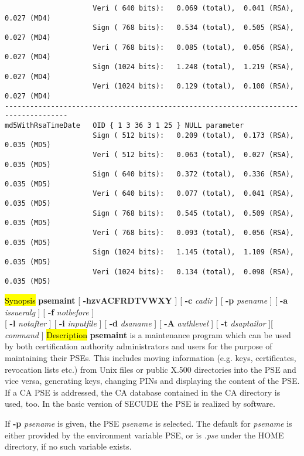 {\begin{verbatim}
                     Veri ( 640 bits):   0.069 (total),  0.041 (RSA),  0.027 (MD4)  
                     Sign ( 768 bits):   0.534 (total),  0.505 (RSA),  0.027 (MD4)  
                     Veri ( 768 bits):   0.085 (total),  0.056 (RSA),  0.027 (MD4)  
                     Sign (1024 bits):   1.248 (total),  1.219 (RSA),  0.027 (MD4)  
                     Veri (1024 bits):   0.129 (total),  0.100 (RSA),  0.027 (MD4)  
-------------------------------------------------------------------------------------
md5WithRsaTimeDate   OID { 1 3 36 3 1 25 } NULL parameter
                     Sign ( 512 bits):   0.209 (total),  0.173 (RSA),  0.035 (MD5)  
                     Veri ( 512 bits):   0.063 (total),  0.027 (RSA),  0.035 (MD5)  
                     Sign ( 640 bits):   0.372 (total),  0.336 (RSA),  0.035 (MD5)  
                     Veri ( 640 bits):   0.077 (total),  0.041 (RSA),  0.035 (MD5)  
                     Sign ( 768 bits):   0.545 (total),  0.509 (RSA),  0.035 (MD5)  
                     Veri ( 768 bits):   0.093 (total),  0.056 (RSA),  0.035 (MD5)  
                     Sign (1024 bits):   1.145 (total),  1.109 (RSA),  0.035 (MD5)  
                     Veri (1024 bits):   0.134 (total),  0.098 (RSA),  0.035 (MD5)  
\end{verbatim}
}

\label{psemaint}
\hl{Synopsis}
{\bf psemaint} [ {\bf -hzvACFRDTVWXY} ] [ {\bf -c} {\em cadir} ] [ {\bf -p} {\em psename} ] [ {\bf -a} {\em 
issueralg} ] [ {\bf -f} {\em notbefore} ] 
\\ \hspace*{1.59cm} [ {\bf -l} {\em notafter} ] [ {\bf -i} {\em inputfile} ] [ {\bf -d} {\em dsaname} ] [ {\bf -A} {\em authlevel} ] [ {\bf -t} {\em dsaptailor} ][ {\em command} ]
\hl{Description}
{\bf psemaint} is a maintenance program which can be used by both
certification authority administrators and users for the purpose of maintaining their
PSEs. This includes moving information (e.g. keys, certificates, revocation lists etc.) from Unix files
or public X.500 directories into the PSE and vice versa, generating keys, changing PINs and displaying the 
content
of the PSE. If a CA PSE is addressed, the CA database contained in the CA directory is used, too.
In the basic version of SECUDE the PSE is realized by software.

If {\bf -p} {\em psename} is given, the PSE {\em psename} is selected. The default for
{\em psename} is either provided by the environment variable PSE, or is {\em .pse} under the
HOME directory, if no such variable exists.

